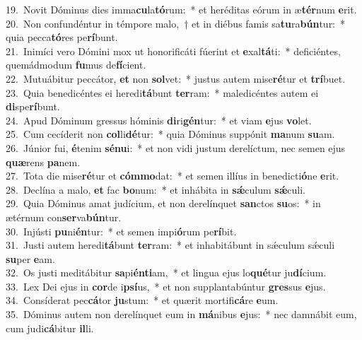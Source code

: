 {19.~}Novit Dóminus dies imma\textbf{cu}la\textbf{tó}rum:~* et heréditas eórum in æ\textbf{tér}num \textbf{e}rit.\\
{20.~}Non confundéntur in témpore malo,~† et in diébus famis sa\textbf{tu}ra\textbf{bún}tur:~* quia pecca\textbf{tó}res pe\textbf{rí}bunt.\\
{21.~}Inimíci vero Dómini mox ut honorificáti fúerint et \textbf{e}xal\textbf{tá}ti:~* deficiéntes, quemádmodum \textbf{fu}mus de\textbf{fí}cient.\\
{22.~}Mutuábitur peccátor, \textbf{et} non \textbf{sol}vet:~* justus autem mise\textbf{ré}tur et \textbf{trí}buet.\\
{23.~}Quia benedicéntes ei heredi\textbf{tá}bunt \textbf{ter}ram:~* maledicéntes autem ei \textbf{di}spe\textbf{rí}bunt.\\
{24.~}Apud Dóminum gressus hóminis \textbf{di}ri\textbf{gén}tur:~* et viam \textbf{e}jus \textbf{vo}let.\\
{25.~}Cum cecíderit non \textbf{col}li\textbf{dé}tur:~* quia Dóminus suppónit \textbf{ma}num \textbf{su}am.\\
{26.~}Júnior fui, \textbf{é}tenim \textbf{sé}\textbf{nu}i:~* et non vidi justum derelíctum, nec semen ejus \textbf{quæ}rens \textbf{pa}nem.\\
{27.~}Tota die mise\textbf{ré}tur et \textbf{cóm}\textbf{mo}dat:~* et semen illíus in benedicti\textbf{ó}ne \textbf{e}rit.\\
{28.~}Declína a malo, \textbf{et} fac \textbf{bo}num:~* et inhábita in \textbf{sǽ}culum \textbf{sǽ}culi.\\
{29.~}Quia Dóminus amat judícium, et non derelínquet \textbf{san}ctos \textbf{su}os:~* in ætérnum con\textbf{ser}va\textbf{bún}tur.\\
{30.~}Injústi \textbf{pu}ni\textbf{én}tur:~* et semen impi\textbf{ó}rum pe\textbf{rí}bit.\\
{31.~}Justi autem heredi\textbf{tá}bunt \textbf{ter}ram:~* et inhabitábunt in sǽculum sǽculi \textbf{su}per \textbf{e}am.\\
{32.~}Os justi meditábitur \textbf{sa}pi\textbf{én}\textbf{ti}am,~* et lingua ejus lo\textbf{qué}tur ju\textbf{dí}cium.\\
{33.~}Lex Dei ejus in \textbf{cor}de i\textbf{psí}us,~* et non supplantabúntur \textbf{gres}sus \textbf{e}jus.\\
{34.~}Consíderat pec\textbf{cá}tor \textbf{ju}stum:~* et quærit mortifi\textbf{cá}re \textbf{e}um.\\
{35.~}Dóminus autem non derelínquet eum in \textbf{má}nibus \textbf{e}jus:~* nec damnábit eum, cum judi\textbf{cá}bitur \textbf{il}li.\\
